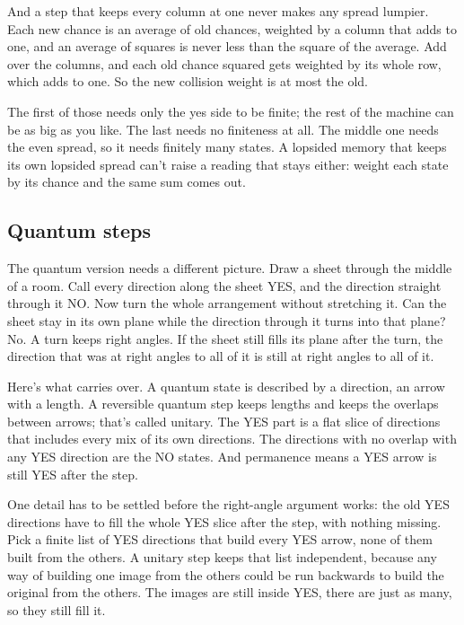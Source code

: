 \documentclass[11pt,twoside]{article}
\theoremstyle{thielethm}
\theoremstyle{thieledef}
\theoremstyle{thieledef}
\theoremstyle{thieledef}
\theoremstyle{thielethm}
\theoremstyle{thieleobs}
\theoremstyle{thielethm}
\begin{document}
And a step that keeps every column at one never makes any spread lumpier. Each new chance is an average of old chances, weighted by a column that adds to one, and an average of squares is never less than the square of the average. Add over the columns, and each old chance squared gets weighted by its whole row, which adds to one. So the new collision weight is at most the old.

The first of those needs only the yes side to be finite; the rest of the machine can be as big as you like. The last needs no finiteness at all. The middle one needs the even spread, so it needs finitely many states. A lopsided memory that keeps its own lopsided spread can't raise a reading that stays either: weight each state by its chance and the same sum comes out.

\subsection{Quantum steps}

The quantum version needs a different picture. Draw a sheet through the middle of a room. Call every direction along the sheet YES, and the direction straight through it NO. Now turn the whole arrangement without stretching it. Can the sheet stay in its own plane while the direction through it turns into that plane? No. A turn keeps right angles. If the sheet still fills its plane after the turn, the direction that was at right angles to all of it is still at right angles to all of it.

Here's what carries over. A quantum state is described by a direction, an arrow with a length. A reversible quantum step keeps lengths and keeps the overlaps between arrows; that's called unitary. The YES part is a flat slice of directions that includes every mix of its own directions. The directions with no overlap with any YES direction are the NO states. And permanence means a YES arrow is still YES after the step.

One detail has to be settled before the right-angle argument works: the old YES directions have to fill the whole YES slice after the step, with nothing missing. Pick a finite list of YES directions that build every YES arrow, none of them built from the others. A unitary step keeps that list independent, because any way of building one image from the others could be run backwards to build the original from the others. The images are still inside YES, there are just as many, so they still fill it.
\end{document}
